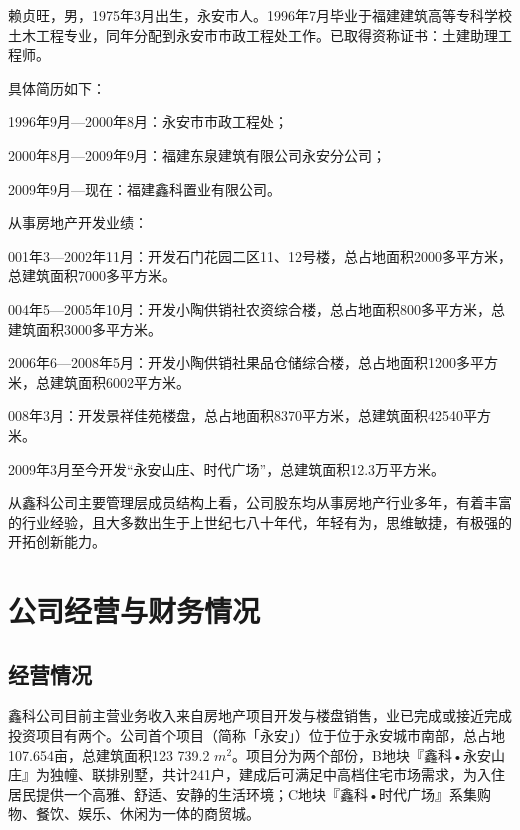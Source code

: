 \begin{mdfbox}[赖贞旺]
赖贞旺，男，1975年3月出生，永安市人。1996年7月毕业于福建建筑高等专科学校土木工程专业，同年分配到永安市市政工程处工作。已取得资称证书：土建助理工程师。

具体简历如下：
\begin{compactitem}
\item 1996年9月—2000年8月：永安市市政工程处；
\item 2000年8月—2009年9月：福建东泉建筑有限公司永安分公司；
\item 2009年9月—现在：福建鑫科置业有限公司。
\end{compactitem}

从事房地产开发业绩：
\begin{compactenum}
\item 001年3—2002年11月：开发石门花园二区11、12号楼，总占地面积2000多平方米，总建筑面积7000多平方米。
\item 004年5—2005年10月：开发小陶供销社农资综合楼，总占地面积800多平方米，总建筑面积3000多平方米。
\item 2006年6—2008年5月：开发小陶供销社果品仓储综合楼，总占地面积1200多平方米，总建筑面积6002平方米。
\item 008年3月：开发景祥佳苑楼盘，总占地面积8370平方米，总建筑面积42540平方米。
\item 2009年3月至今开发“永安山庄、时代广场”，总建筑面积12.3万平方米。
\end{compactenum}
\end{mdfbox}

从鑫科公司主要管理层成员结构上看，公司股东均从事房地产行业多年，有着丰富的行业经验，且大多数出生于上世纪七八十年代，年轻有为，思维敏捷，有极强的开拓创新能力。
\section{公司经营与财务情况}
\subsection{经营情况}

鑫科公司目前主营业务收入来自房地产项目开发与楼盘销售，业已完成或接近完成投资项目有两个。公司首个项目（简称「永安」）位于位于永安城市南部，总占地107.654亩，总建筑面积123 739.2 $m^2$。项目分为两个部份，B地块『鑫科•永安山庄』为独幢、联排别墅，共计241户，建成后可满足中高档住宅市场需求，为入住居民提供一个高雅、舒适、安静的生活环境；C地块『鑫科•时代广场』系集购物、餐饮、娱乐、休闲为一体的商贸城。

